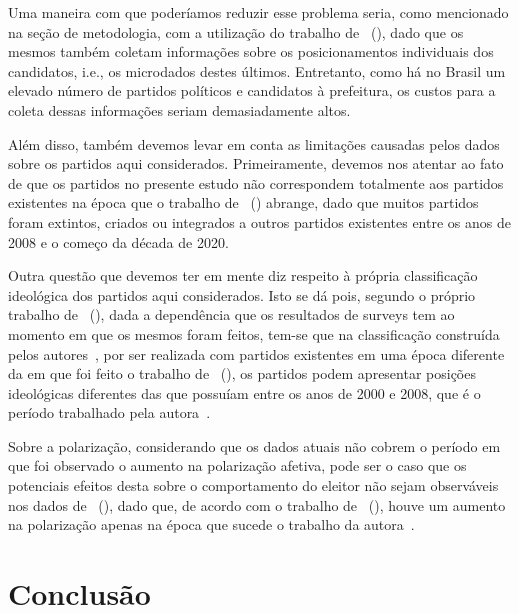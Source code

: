 \documentclass[
	12pt,				%
	openright,			%
	twoside,			%
	a4paper,			%
	openany,
	english,			%
	brazil				%
	]{abntex2}
\begin{document}
Uma maneira com que poderíamos reduzir esse problema seria, como mencionado na seção de metodologia, com a utilização do trabalho de ~(\citeyear{Power2009}), dado que os mesmos também coletam informações sobre os posicionamentos individuais dos candidatos, i.e., os microdados destes últimos. Entretanto, como há no Brasil um elevado número de partidos políticos e candidatos à prefeitura, os custos para a coleta dessas informações seriam demasiadamente altos.

Além disso, também devemos levar em conta as limitações causadas pelos dados sobre os partidos aqui considerados. Primeiramente, devemos nos atentar ao fato de que os partidos no presente estudo não correspondem totalmente aos partidos existentes na época que o trabalho de ~(\citeyear{Brollo2013Aug}) abrange, dado que muitos partidos foram extintos, criados ou integrados a outros partidos existentes entre os anos de 2008 e o começo da década de 2020.

Outra questão que devemos ter em mente diz respeito à própria classificação ideológica dos partidos aqui considerados. Isto se dá pois, segundo o próprio trabalho de ~(\citeyear{Bolognesi2022Sep}), dada a dependência que os resultados de surveys tem ao momento em que os mesmos foram feitos, tem-se que na classificação construída pelos autores~\cite{Bolognesi2022Sep}, por ser realizada com partidos existentes em uma época diferente da em que foi feito o trabalho de ~(\citeyear{Brollo2013Aug}), os partidos podem apresentar posições ideológicas diferentes das que possuíam entre os anos de 2000 e 2008, que é o período trabalhado pela autora~\cite{Brollo2013Aug}.

Sobre a polarização, considerando que os dados atuais não cobrem o período em que foi observado o aumento na polarização afetiva, pode ser o caso que os potenciais efeitos desta sobre o comportamento do eleitor não sejam observáveis nos dados de ~(\citeyear{Brollo2013Aug}), dado que, de acordo com o trabalho de ~(\citeyear{fuks2020afeto}), houve um aumento na polarização apenas na época que sucede o trabalho da autora~\cite{Brollo2013Aug}.

\chapter{Conclusão}
\end{document}
